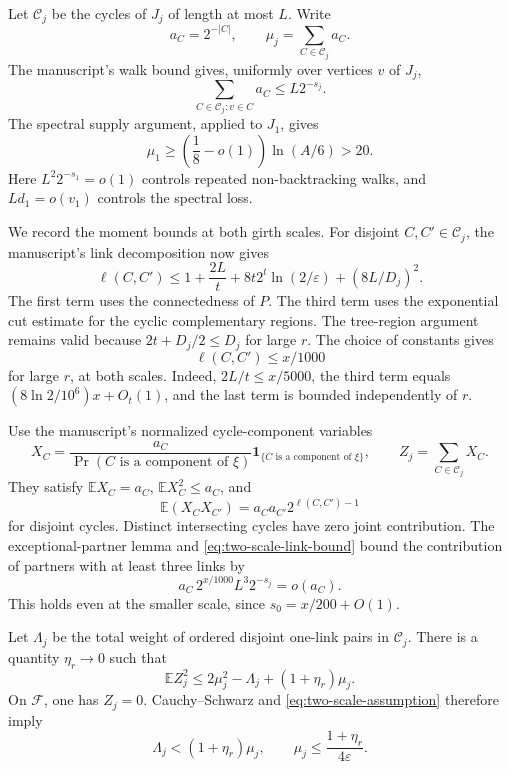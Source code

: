 Let $\mathcal C_j$ be the cycles of $J_j$ of length at most $L$.
Write
\[
 a_C=2^{-|C|},\qquad \mu_j=\sum_{C\in\mathcal C_j}a_C.
\]
The manuscript's walk bound gives, uniformly over vertices $v$ of $J_j$,
\begin{equation}\label{eq:two-scale-local-mass}
 \sum_{C\in\mathcal C_j:v\in C}a_C\le L2^{-s_j}.
\end{equation}
The spectral supply argument, applied to $J_1$, gives
\begin{equation}\label{eq:two-scale-initial-mass}
 \mu_1\ge\left(\frac18-o(1)\right)\ln(A/6)>20.
\end{equation}
Here $L^2 2^{-s_1}=o(1)$ controls repeated non-backtracking walks, and $Ld_1=o(v_1)$ controls the spectral loss.

We record the moment bounds at both girth scales.
For disjoint $C,C'\in\mathcal C_j$, the manuscript's link decomposition now gives
\[
 \ell(C,C')\le1+\frac{2L}{t}
   +8t2^t\ln(2/\varepsilon)+(8L/D_j)^2.
\]
The first term uses the connectedness of $P$.
The third term uses the exponential cut estimate for the cyclic complementary regions.
The tree-region argument remains valid because $2t+D_j/2\le D_j$ for large $r$.
The choice of constants gives
\begin{equation}\label{eq:two-scale-link-bound}
 \ell(C,C')\le x/1000
\end{equation}
for large $r$, at both scales.
Indeed, $2L/t\le x/5000$, the third term equals
$(8\ln2/10^6)x+O_t(1)$, and the last term is bounded independently of $r$.

Use the manuscript's normalized cycle-component variables
\[
 X_C=\frac{a_C}{\Pr(C\text{ is a component of }\xi)}
       \mathbf1_{\{C\text{ is a component of }\xi\}},
 \qquad Z_j=\sum_{C\in\mathcal C_j}X_C.
\]
They satisfy $\mathbb EX_C=a_C$, $\mathbb EX_C^2\le a_C$, and
\[
 \mathbb E(X_CX_{C'})=a_Ca_{C'}2^{\ell(C,C')-1}
\]
for disjoint cycles.
Distinct intersecting cycles have zero joint contribution.
The exceptional-partner lemma and \eqref{eq:two-scale-link-bound} bound the contribution of partners with at least three links by
\[
 a_C\,2^{x/1000}L^3 2^{-s_j}=o(a_C).
\]
This holds even at the smaller scale, since $s_0=x/200+O(1)$.

Let $\Lambda_j$ be the total weight of ordered disjoint one-link pairs in $\mathcal C_j$.
There is a quantity $\eta_r\to0$ such that
\begin{equation}\label{eq:two-scale-inverse-moment}
 \mathbb EZ_j^2
 \le2\mu_j^2-\Lambda_j+(1+\eta_r)\mu_j.
\end{equation}
On $\mathcal F$, one has $Z_j=0$.
Cauchy--Schwarz and \eqref{eq:two-scale-assumption} therefore imply
\begin{equation}\label{eq:two-scale-two-consequences}
 \Lambda_j<(1+\eta_r)\mu_j,
 \qquad
 \mu_j\le\frac{1+\eta_r}{4\varepsilon}.
\end{equation}

